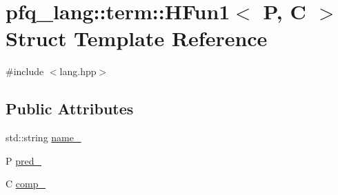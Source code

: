 \hypertarget{structpfq__lang_1_1term_1_1HFun1}{\section{pfq\-\_\-lang\-:\-:term\-:\-:H\-Fun1$<$ P, C $>$ Struct Template Reference}
\label{structpfq__lang_1_1term_1_1HFun1}
}


{\ttfamily \#include $<$lang.\-hpp$>$}

\subsection*{Public Attributes}
\begin{DoxyCompactItemize}
\item 
std\-::string \hyperlink{structpfq__lang_1_1term_1_1HFun1_ac37e99de5e6350b504a03f0e03d725c4}{name\-\_\-}
\item 
P \hyperlink{structpfq__lang_1_1term_1_1HFun1_ac15b6e2665e60ad7f1700797c7677ea6}{pred\-\_\-}
\item 
C \hyperlink{structpfq__lang_1_1term_1_1HFun1_a16b8c06ef73b339272e21dbfd5be962c}{comp\-\_\-}
\end{DoxyCompactItemize}


